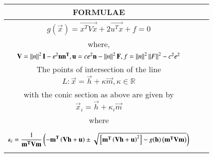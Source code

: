 \begin{tabular}[12pt]{|c|c|c|}
\hline
\textbf{FORMULAE} \\
\hline
$ g(\vec{x}) = \vec{x^TVx} + 2\vec{u^Tx} + f = 0 $ \\
where, \\
$\mathbf{V} = \left\lVert n\right\rVert^2\mathbf{I} - e^2\mathbf{nn^T} ,\\
\mathbf{u} = ce^2\mathbf{n} - \left\lVert n\right\rVert^2\mathbf{F} ,\\
f = \left\lVert n\right\rVert^2\left\lVert F\right\rVert^2 - c^2e^2 $ \\
\hline
The points of intersection of the line $$ L: \vec{x} = \vec{h} + \kappa\vec{m},  \kappa \in \mathbb{R} $$ \\
with the conic section as above are given by $$ \vec{x}_i = \vec{h} + \kappa_i\vec{m} $$ \\
where \\
	$$ \kappa_i = \frac{1}{\mathbf{m^TVm}}\left(\mathbf{-m^T\left(Vh+u\right)} \pm \sqrt{{}\left[\mathbf{m^T\left(Vh+u\right)}^2\right] - g(\mathbf{h})\left(\mathbf{m^TVm}\right)}\right) $$ \\
\hline
\end{tabular}
